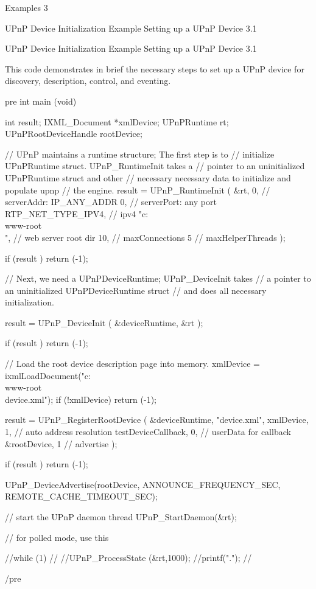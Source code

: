 \documentclass{article}
\begin{document}
\begin{cxxentry}
{}
        {Examples }
        {}
        {}
        {3}
\begin{cxxnames}
\cxxitem{}
        {UPnP Device Initialization Example}
        {}
        {Setting up a UPnP Device }
        {3.1}
\end{cxxnames}
\begin{cxxentry}
{}
        {UPnP Device Initialization Example}
        {}
        {Setting up a UPnP Device }
        {3.1}
\begin{cxxdoc}

This code demonstrates in brief the necessary steps to set up a UPnP device
for discovery, description, control, and eventing.

\<pre\>
int main (void)
{
int result;
IXML\_Document *xmlDevice;
UPnPRuntime rt;
UPnPRootDeviceHandle rootDevice;


// UPnP maintains a runtime structure; The first step is to
// initialize UPnPRuntime struct. UPnP\_RuntimeInit takes a
// pointer to an uninitialized UPnPRuntime struct and other
// necessary necessary data to initialize and populate upnp
// the engine.
result = UPnP\_RuntimeInit (
\&rt,
0,                  // serverAddr: IP\_ANY\_ADDR
0,                  // serverPort: any port
RTP\_NET\_TYPE\_IPV4,  // ipv4
"c:\\www-root\\",   // web server root dir
10,                 // maxConnections
5                   // maxHelperThreads
);

if (result )
{
return (-1);
}

// Next, we need a UPnPDeviceRuntime; UPnP\_DeviceInit takes
//  a pointer to an uninitialized UPnPDeviceRuntime struct
//  and does all necessary initialization.

result = UPnP\_DeviceInit (
\&deviceRuntime,
\&rt
);

if (result )
{
return (-1);
}

// Load the root device description page into memory.
xmlDevice = ixmlLoadDocument("c:\\www-root\\device.xml");
if (!xmlDevice)
{
return (-1);
}


result = UPnP\_RegisterRootDevice (
\&deviceRuntime,
"device.xml",
xmlDevice,
1,                  // auto address resolution
testDeviceCallback,
0,                  // userData for callback
\&rootDevice,
1                   // advertise
);

if (result )
{
return (-1);
}

UPnP\_DeviceAdvertise(rootDevice, ANNOUNCE\_FREQUENCY\_SEC,
REMOTE\_CACHE\_TIMEOUT\_SEC);

// start the UPnP daemon thread
UPnP\_StartDaemon(\&rt);

// for polled mode, use this

//while (1)
//{
//UPnP\_ProcessState (\&rt,1000);
//printf(".");
//}

}

\</pre\>

\end{cxxdoc}
\end{cxxentry}
\end{cxxentry}
\end{document}
